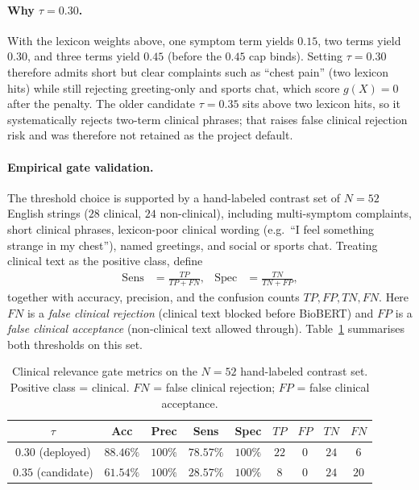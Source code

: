 \paragraph{Why \(\tau=0.30\).}
With the lexicon weights above, one symptom term yields \(0.15\), two terms yield \(0.30\), and three terms yield \(0.45\) (before the \(0.45\) cap binds). Setting \(\tau=0.30\) therefore admits short but clear complaints such as ``chest pain'' (two lexicon hits) while still rejecting greeting-only and sports chat, which score \(g(X)=0\) after the penalty. The older candidate \(\tau=0.35\) sits above two lexicon hits, so it systematically rejects two-term clinical phrases; that raises false clinical rejection risk and was therefore not retained as the project default.

\paragraph{Empirical gate validation.}
The threshold choice is supported by a hand-labeled contrast set of \(N=52\) English strings (\(28\) clinical, \(24\) non-clinical), including multi-symptom complaints, short clinical phrases, lexicon-poor clinical wording (e.g.\ ``I feel something strange in my chest''), named greetings, and social or sports chat. Treating clinical text as the positive class, define
\begin{align*}
  \mathrm{Sens} &= \frac{TP}{TP+FN}, &
  \mathrm{Spec} &= \frac{TN}{TN+FP},
\end{align*}
together with accuracy, precision, and the confusion counts \(TP,FP,TN,FN\). Here \(FN\) is a \emph{false clinical rejection} (clinical text blocked before BioBERT) and \(FP\) is a \emph{false clinical acceptance} (non-clinical text allowed through). Table~\ref{tab:gate-metrics} summarises both thresholds on this set.

\begin{table}[H]
\centering
\small
\begin{tabular}{|c|c|c|c|c|c|c|c|c|}
\hline
\(\tau\) & Acc & Prec & Sens & Spec & \(TP\) & \(FP\) & \(TN\) & \(FN\) \\
\hline
\(0.30\) (deployed) & \(88.46\%\) & \(100\%\) & \(78.57\%\) & \(100\%\) & \(22\) & \(0\) & \(24\) & \(6\) \\
\(0.35\) (candidate) & \(61.54\%\) & \(100\%\) & \(28.57\%\) & \(100\%\) & \(8\) & \(0\) & \(24\) & \(20\) \\
\hline
\end{tabular}
\caption{Clinical relevance gate metrics on the \(N=52\) hand-labeled contrast set. Positive class = clinical. \(FN\) = false clinical rejection; \(FP\) = false clinical acceptance.}
\label{tab:gate-metrics}
\end{table}

